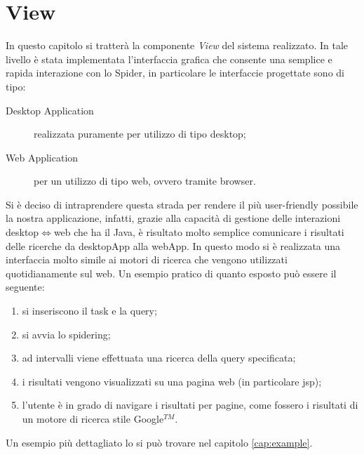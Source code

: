 \chapter{View}\label{cap:view}
In questo capitolo si tratterà la componente \textit{View} del sistema realizzato. In tale livello è stata implementata l'interfaccia grafica che consente una semplice e rapida interazione con lo Spider, in particolare le interfaccie progettate sono di tipo:
\begin{description}
\item[Desktop Application] realizzata puramente per utilizzo di tipo desktop;
\item[Web Application] per un utilizzo di tipo web, ovvero tramite browser.
\end{description}
Si è deciso di intraprendere questa strada per rendere il più user-friendly possibile la nostra applicazione, infatti, grazie alla capacità di gestione delle interazioni desktop$\Leftrightarrow$web che ha il Java, è risultato molto semplice comunicare i risultati delle ricerche da desktopApp alla webApp. In questo modo si è realizzata una interfaccia molto simile ai motori di ricerca che vengono utilizzati quotidianamente sul web. Un esempio pratico di quanto esposto può essere il seguente:
\begin{enumerate}
\item si inseriscono il task e la query;
\item si avvia lo spidering;
\item ad intervalli viene effettuata una ricerca della query specificata;
\item i risultati vengono visualizzati su una pagina web (in particolare jsp);
\item l'utente è in grado di navigare i risultati per pagine, come fossero i risultati di un motore di ricerca stile Google$^{TM}$.
\end{enumerate}
Un esempio più dettagliato lo si può trovare nel capitolo \ref{cap:example}.
